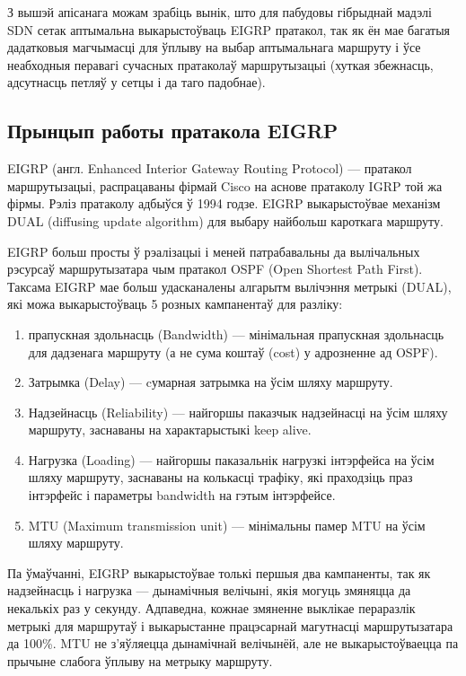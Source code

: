 З вышэй апісанага можам зрабіць вынік, што для пабудовы гібрыднай мадэлі
SDN сетак аптымальна выкарыстоўваць EIGRP пратакол, так як ён мае багатыя
дадатковыя магчымасці для ўплыву на выбар аптымальнага маршруту і ўсе
неабходныя перавагі сучасных пратаколаў маршрутызацыі (хуткая збежнасць, адсутнасць петляў у сетцы і да таго падобнае).

\subsection{Прынцып работы пратакола EIGRP}

EIGRP (англ. Enhanced Interior Gateway Routing Protocol) --- пратакол маршрутызацыі, распрацаваны фірмай Cisco на аснове пратаколу IGRP той жа фірмы. Рэліз пратаколу адбыўся ў 1994 годзе. EIGRP выкарыстоўвае механізм DUAL (diffusing update algorithm) для выбару найбольш кароткага маршруту.

EIGRP больш просты ў рэалізацыі і меней патрабавальны да вылічальных рэсурсаў маршрутызатара чым пратакол OSPF (Open Shortest Path First). Таксама EIGRP мае больш удасканалены алгарытм вылічэння метрыкі (DUAL), які можа выкарыстоўваць 5 розных кампанентаў для разліку:

\begin{enumerate}
    \item прапускная здольнасць (Bandwidth) --- мінімальная прапускная здольнасць для дадзенага маршруту (а не сума коштаў (cost) у адрозненне ад OSPF).
    \item Затрымка (Delay) --- cумарная затрымка на ўсім шляху маршруту.
    \item Надзейнасць (Reliability) --- найгоршы паказчык надзейнасці на ўсім шляху маршруту, заснаваны на характарыстыкі keep alive.
    \item Нагрузка (Loading) --- найгоршы паказальнік нагрузкі інтэрфейса на ўсім шляху маршруту, заснаваны на колькасці трафіку, які праходзіць праз інтэрфейс і параметры bandwidth на гэтым інтэрфейсе.
    \item MTU (Maximum transmission unit) --- мінімальны памер MTU на ўсім шляху маршруту.
\end{enumerate}

Па ўмаўчанні, EIGRP выкарыстоўвае толькі першыя два кампаненты, так як надзейнасць і нагрузка --- дынамічныя велічыні, якія могуць змяняцца да некалькіх раз у секунду. Адпаведна, кожнае змяненне выклікае пераразлік метрыкі для маршрутаў і выкарыстанне працэсарнай магутнасці маршрутызатара да 100\%. MTU не з'яўляецца дынамічнай велічынёй, але не выкарыстоўваецца па прычыне слабога ўплыву на метрыку маршруту.

